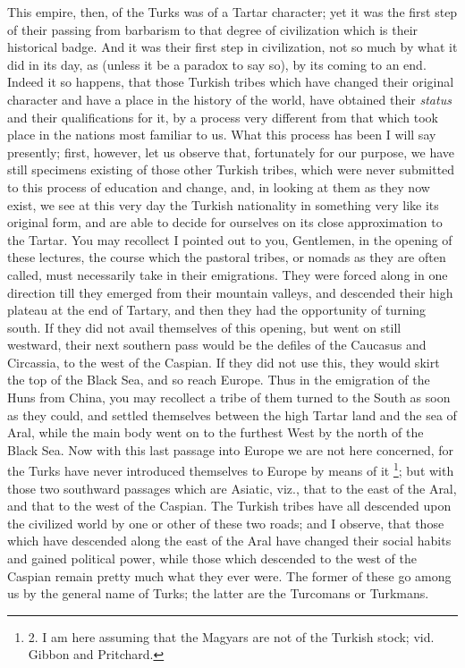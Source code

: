 This empire, then, of the
Turks was of a Tartar character; yet it was the first step of their
passing from barbarism to that degree of civilization which is their
historical badge. And it was their first step in civilization, not so
much by what it did in its day, as (unless it be a paradox to say so),
by its coming to an end. Indeed it so happens, that those Turkish
tribes which have changed their original character and have a place in
the history of the world, have obtained their \emph{status} and their
qualifications for it, by a process very different from that which
took place in the nations most familiar to us. What this process has
been I will say presently; first, however, let us observe that,
fortunately for our purpose, we have still specimens existing of those
other Turkish tribes, which were never submitted to this process of
education and change, and, in looking at them as they now exist, we
see at this very day the Turkish nationality in something very like
its original form, and are able to decide for ourselves on its close
approximation to the Tartar. You may recollect I pointed out to you,
Gentlemen, in the opening of these lectures, the course which the
pastoral tribes, or nomads as they are often called, must necessarily
take in their emigrations. They were forced along in one direction
till they emerged from their mountain valleys, and descended their
high plateau at the end of Tartary, and then they had the opportunity
of turning south. If they did not avail themselves of this
opening, but went on still westward, their next southern pass would be
the defiles of the Caucasus and Circassia, to the west of the Caspian.
If they did not use this, they would skirt the top of the Black Sea,
and so reach Europe. Thus in the emigration of the Huns from China,
you may recollect a tribe of them turned to the South as soon as they
could, and settled themselves between the high Tartar land and the sea
of Aral, while the main body went on to the furthest West by the north
of the Black Sea. Now with this last passage into Europe we are not
here concerned, for the Turks have never introduced themselves to
Europe by means of it \footnote{2.
I am here assuming that the Magyars are not of the Turkish stock; vid.
Gibbon and Pritchard.};
but with those two southward passages which are Asiatic, viz., that to
the east of the Aral, and that to the west of the Caspian. The Turkish
tribes have all descended upon the civilized world by one or other of
these two roads; and I observe, that those which have descended along
the east of the Aral have changed their social habits and gained
political power, while those which descended to the west of the
Caspian remain pretty much what they ever were. The former of these go
among us by the general name of Turks; the latter are the Turcomans or
Turkmans.

